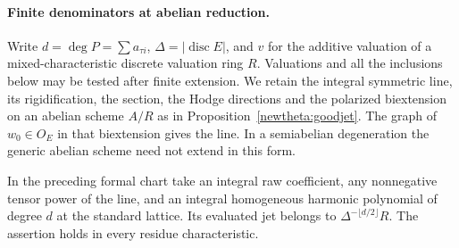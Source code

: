 \paragraph{Finite denominators at abelian reduction.}
\label{intjet:sec}
Write \(d=\deg P=\sum a_{\tau i}\), \(\Delta=|\operatorname{disc}E|\),
and \(v\) for the additive valuation of a mixed-characteristic
discrete valuation ring \(R\). Valuations and all the inclusions below
may be tested after finite extension. We retain the integral symmetric
line, its rigidification, the section, the Hodge directions and the
polarized biextension on an abelian scheme \(A/R\) as in
Proposition~\ref{newtheta:goodjet}. The graph of \(w_0\in O_E\)
in that biextension gives the line. In a semiabelian degeneration the
generic abelian scheme need not extend in this form.

\begin{lemma}\label{intjet:der}
In the preceding formal chart take an integral raw coefficient,
any nonnegative tensor power of the line, and an integral homogeneous
harmonic polynomial of degree \(d\) at the standard lattice.
Its evaluated jet belongs to \(\Delta^{-\lfloor d/2\rfloor}R\).
The assertion holds in every residue characteristic.
\end{lemma}
